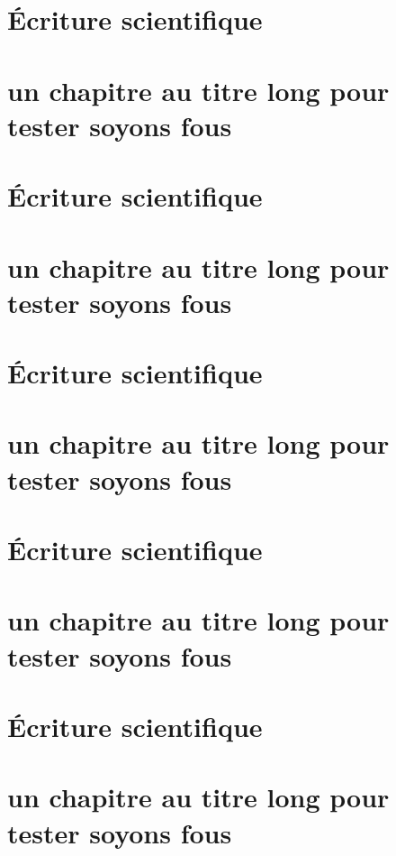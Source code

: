 \documentclass[a4paper, 11pt, twoside, fleqn]{memoir}
\begin{document}
\chapter{\'Ecriture scientifique}
\chapter{un chapitre au titre long pour tester soyons fous}
\chapter{\'Ecriture scientifique}
\chapter{un chapitre au titre long pour tester soyons fous}
\chapter{\'Ecriture scientifique}
\chapter{un chapitre au titre long pour tester soyons fous}
\chapter{\'Ecriture scientifique}
\chapter{un chapitre au titre long pour tester soyons fous}
\chapter{\'Ecriture scientifique}
\chapter{un chapitre au titre long pour tester soyons fous}
\end{document}
